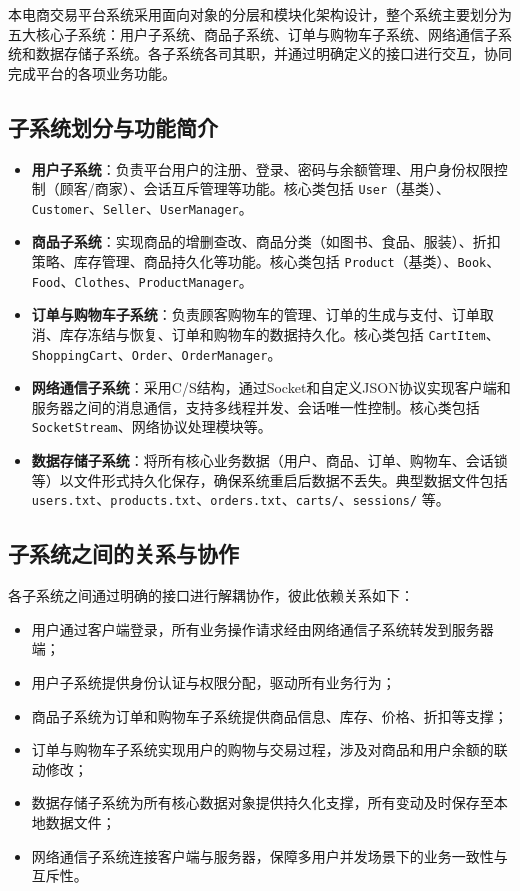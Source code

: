 \documentclass[11pt]{article}
\begin{document}
本电商交易平台系统采用面向对象的分层和模块化架构设计，整个系统主要划分为五大核心子系统：用户子系统、商品子系统、订单与购物车子系统、网络通信子系统和数据存储子系统。各子系统各司其职，并通过明确定义的接口进行交互，协同完成平台的各项业务功能。

\subsection{子系统划分与功能简介}

\begin{itemize}
    \item \textbf{用户子系统}：负责平台用户的注册、登录、密码与余额管理、用户身份权限控制（顾客/商家）、会话互斥管理等功能。核心类包括 \texttt{User}（基类）、\texttt{Customer}、\texttt{Seller}、\texttt{UserManager}。
    
    \item \textbf{商品子系统}：实现商品的增删查改、商品分类（如图书、食品、服装）、折扣策略、库存管理、商品持久化等功能。核心类包括 \texttt{Product}（基类）、\texttt{Book}、\texttt{Food}、\texttt{Clothes}、\texttt{ProductManager}。
    
    \item \textbf{订单与购物车子系统}：负责顾客购物车的管理、订单的生成与支付、订单取消、库存冻结与恢复、订单和购物车的数据持久化。核心类包括 \texttt{CartItem}、\texttt{ShoppingCart}、\texttt{Order}、\texttt{OrderManager}。
    
    \item \textbf{网络通信子系统}：采用C/S结构，通过Socket和自定义JSON协议实现客户端和服务器之间的消息通信，支持多线程并发、会话唯一性控制。核心类包括 \texttt{SocketStream}、网络协议处理模块等。
    
    \item \textbf{数据存储子系统}：将所有核心业务数据（用户、商品、订单、购物车、会话锁等）以文件形式持久化保存，确保系统重启后数据不丢失。典型数据文件包括 \texttt{users.txt}、\texttt{products.txt}、\texttt{orders.txt}、\texttt{carts/}、\texttt{sessions/} 等。
\end{itemize}

\subsection{子系统之间的关系与协作}

各子系统之间通过明确的接口进行解耦协作，彼此依赖关系如下：

\begin{itemize}
    \item 用户通过客户端登录，所有业务操作请求经由网络通信子系统转发到服务器端；
    \item 用户子系统提供身份认证与权限分配，驱动所有业务行为；
    \item 商品子系统为订单和购物车子系统提供商品信息、库存、价格、折扣等支撑；
    \item 订单与购物车子系统实现用户的购物与交易过程，涉及对商品和用户余额的联动修改；
    \item 数据存储子系统为所有核心数据对象提供持久化支撑，所有变动及时保存至本地数据文件；
    \item 网络通信子系统连接客户端与服务器，保障多用户并发场景下的业务一致性与互斥性。
\end{itemize}
\end{document}
